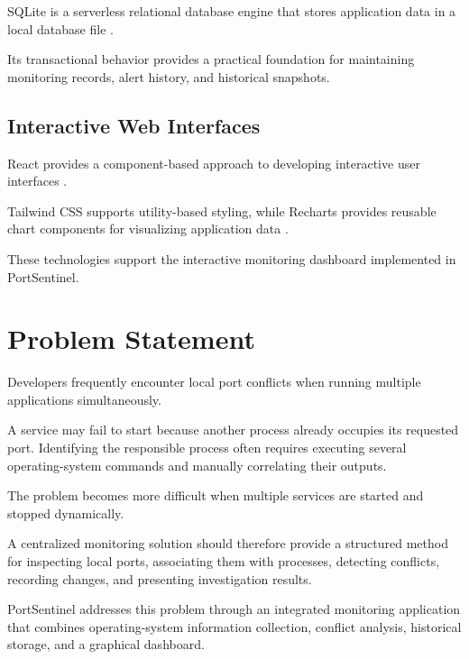 \documentclass[conference]{IEEEtran}
\begin{document}
SQLite is a serverless relational database engine that
stores application data in a local database file
\cite{sqlite,sqliteabout}.

Its transactional behavior provides a practical
foundation for maintaining monitoring records,
alert history, and historical snapshots.

\subsection{Interactive Web Interfaces}

React provides a component-based approach to developing
interactive user interfaces \cite{react}.

Tailwind CSS supports utility-based styling, while
Recharts provides reusable chart components for
visualizing application data \cite{tailwind,recharts}.

These technologies support the interactive monitoring
dashboard implemented in PortSentinel.

\section{Problem Statement}

Developers frequently encounter local port conflicts
when running multiple applications simultaneously.

A service may fail to start because another process
already occupies its requested port. Identifying the
responsible process often requires executing several
operating-system commands and manually correlating
their outputs.

The problem becomes more difficult when multiple
services are started and stopped dynamically.

A centralized monitoring solution should therefore
provide a structured method for inspecting local
ports, associating them with processes, detecting
conflicts, recording changes, and presenting
investigation results.

PortSentinel addresses this problem through an
integrated monitoring application that combines
operating-system information collection, conflict
analysis, historical storage, and a graphical
dashboard.

\end{document}

